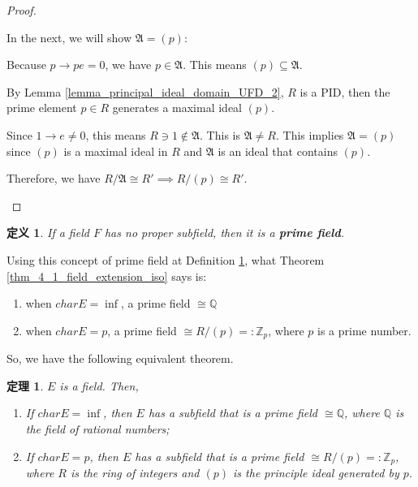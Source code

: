 \documentclass[utf8]{ctexbook}
\newtheorem{theorem}{定理}[section]
\newtheorem{definition}{定义}[section]
\begin{document}
\begin{proof}
\begin{enumerate}
{In the next, we will show $\mathfrak{A} = (p)$:

Because $p \longrightarrow pe = 0$, we have $p \in \mathfrak{A}$. This means $(p) \subseteq \mathfrak{A}$. 

By Lemma \ref{lemma_principal_ideal_domain_UFD_2}, $R$ is a PID, then the prime element $p \in R$ generates a maximal ideal $(p)$.

Since $1 \longrightarrow e \neq 0$, this means $ R \ni 1 \not \in \mathfrak{A}$. This is $\mathfrak{A} \neq R$. This implies $\mathfrak{A} = (p)$ since $(p)$ is a maximal ideal in $R$ and $\mathfrak{A}$ is an ideal that contains $(p)$.

Therefore, we have $R / \mathfrak{A} \cong R' \implies R /(p) \cong R'$. 
}

\end{enumerate}

\end{proof}

\begin{definition}\label{def_prime_field}
If a field $F$ has no proper subfield, then it is a \textbf{prime field}.
\end{definition}

Using this concept of prime field at Definition \ref{def_prime_field}, what Theorem \ref{thm_4_1_field_extension_iso} says is:
\begin{enumerate}
\item{when $char E = \inf$, a prime field $\cong \mathbb{Q}$ }
\item{when $char E = p$, a prime field $\cong R/(p) =:\mathbb{Z}_p$, where $p$ is a prime number.}
\end{enumerate} 

So, we have the following equivalent theorem.

\begin{theorem}\label{thm_4_2_field_extension_iso}
$E$ is a field. Then,

\begin{enumerate}
\item{If $char E = \inf$, then $E$ has a subfield that is a prime field $ \cong \mathbb{Q}$, where $\mathbb{Q}$ is the field of rational numbers;}
\item{If $char E = p$, then $E$ has a subfield that is a prime field $ \cong R/(p) =: \mathbb{Z}_p$, where $R$ is the ring of integers and $(p)$ is the principle ideal generated by $p$.}
\end{enumerate}
\end{theorem}
\end{document}
